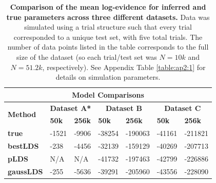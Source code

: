 \begin{table}[t]
\centering
\setlength{\tabcolsep}{4.2pt}
 \caption[Comparison of the mean log-evidence for inferred and true parameters across three different datasets]{\textbf{Comparison of the mean log-evidence for inferred and true parameters across three different datasets.} Data was simulated using a trial structure such that every trial corresponded to a unique test set, with five total trials. The number of data points listed in the table corresponds to the full size of the dataset (so each trial/test set was $N=10k$ and $N=51.2k$, respectively). See Appendix Table \ref{table:ap2:1} for details on simulation parameters. }
 \vspace{0.2cm}
\begin{tabular}{ |p{2.1cm}||p{1.4cm}|p{1.4cm}|p{1.4cm}|p{1.4cm}|p{1.4cm}|p{1.4cm}|}
 \hline
 \multicolumn{7}{|c|}{\textbf{Model Comparisons} } \\
 \hline
 \multirow{2}{0em}{\textbf{Method}} & \multicolumn{2}{|c|}{\textbf{Dataset A*}} & \multicolumn{2}{|c|}{\textbf{Dataset B}} & \multicolumn{2}{|c|}{\textbf{Dataset C}} \\ 
 \cline{2-7}
& \textbf{50k} & \textbf{256k} & \textbf{50k} & \textbf{256k} & \textbf{50k} & \textbf{256k} \\
 \hline
 \textbf{true}  &   -1521  & -9906 &  -38254   &   -190063 & -41161 & -211821 \\
 \textbf{bestLDS}  & -238  & -4456  & -32139 & -159129 &  -40269 & -207713 \\
 \textbf{pLDS}   &    N/A &    N/A  & -41732 & -197463 &  -42799 &  -226886 \\
 \textbf{gaussLDS}   & -255 &  -5636 & -39291 & -205960 &  -43556 &   -228090 \\
 \hline
\end{tabular}
\vspace{-0.35cm}
\label{table:bestlds:1}
\end{table}

